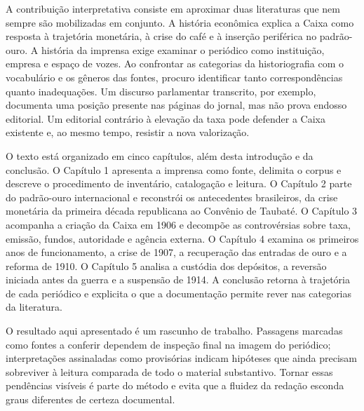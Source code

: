 A contribuição interpretativa consiste em aproximar duas literaturas que nem sempre são mobilizadas em conjunto. A história econômica explica a Caixa como resposta à trajetória monetária, à crise do café e à inserção periférica no padrão-ouro. A história da imprensa exige examinar o periódico como instituição, empresa e espaço de vozes. Ao confrontar as categorias da historiografia com o vocabulário e os gêneros das fontes, procuro identificar tanto correspondências quanto inadequações. Um discurso parlamentar transcrito, por exemplo, documenta uma posição presente nas páginas do jornal, mas não prova endosso editorial. Um editorial contrário à elevação da taxa pode defender a Caixa existente e, ao mesmo tempo, resistir a nova valorização.

O texto está organizado em cinco capítulos, além desta introdução e da conclusão. O Capítulo 1 apresenta a imprensa como fonte, delimita o corpus e descreve o procedimento de inventário, catalogação e leitura. O Capítulo 2 parte do padrão-ouro internacional e reconstrói os antecedentes brasileiros, da crise monetária da primeira década republicana ao Convênio de Taubaté. O Capítulo 3 acompanha a criação da Caixa em 1906 e decompõe as controvérsias sobre taxa, emissão, fundos, autoridade e agência externa. O Capítulo 4 examina os primeiros anos de funcionamento, a crise de 1907, a recuperação das entradas de ouro e a reforma de 1910. O Capítulo 5 analisa a custódia dos depósitos, a reversão iniciada antes da guerra e a suspensão de 1914. A conclusão retorna à trajetória de cada periódico e explicita o que a documentação permite rever nas categorias da literatura.

O resultado aqui apresentado é um rascunho de trabalho. Passagens marcadas como fontes a conferir dependem de inspeção final na imagem do periódico; interpretações assinaladas como provisórias indicam hipóteses que ainda precisam sobreviver à leitura comparada de todo o material substantivo. Tornar essas pendências visíveis é parte do método e evita que a fluidez da redação esconda graus diferentes de certeza documental.
